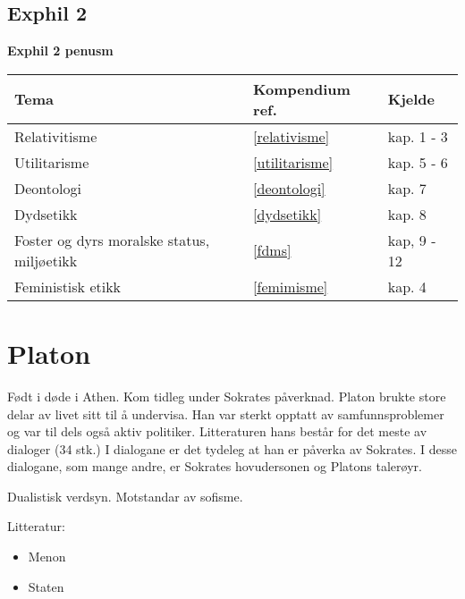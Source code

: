 \documentclass[a4paper]{IEEEtran}
\begin{document}
\subsection{Exphil 2}\bigskip
\begin{center}

\textbf{Exphil 2 penusm}\bigskip

\begin{tabularx}{0.75\textwidth}{| X | X | X |}\hline	  
            Tema
            &
            Kompendium ref.
            &
            Kjelde \\ \hline
            Relativitisme 
            &
            \ref{relativisme}
            &
            kap. 1 - 3
            \\ \hline
            Utilitarisme 
            &
            \ref{utilitarisme}
            &
            kap. 5 - 6
            \\ \hline
            Deontologi
            &
            \ref{deontologi}
            &
            kap. 7
            \\ \hline
            Dydsetikk 
            &
            \ref{dydsetikk}
            &
            kap. 8
            \\ \hline
            Foster og dyrs moralske status, miljøetikk 
            &
            \ref{fdms}
            & 
            kap, 9 - 12
            \\ \hline
            Feministisk etikk 
            &
            \ref{femimisme}
            & 
            kap. 4
            \\ \hline
    \end{tabularx}
\end{center}\clearpage
\twocolumn
\section{Platon}
\label{platon}

Født i døde i Athen. Kom tidleg under Sokrates påverknad. Platon brukte store delar av livet sitt til å undervisa. Han var sterkt opptatt av samfunnsproblemer og var til dels også aktiv politiker. Litteraturen hans består for det meste av dialoger (34 stk.) I dialogane er det tydeleg at han er påverka av Sokrates. I desse dialogane, som mange andre, er Sokrates hovudersonen og Platons talerøyr.\bigskip

Dualistisk verdsyn. Motstandar av sofisme.\bigskip

Litteratur:
\begin{itemize}
    \item Menon
    \item Staten
\end{itemize}\bigskip 
\end{document}
